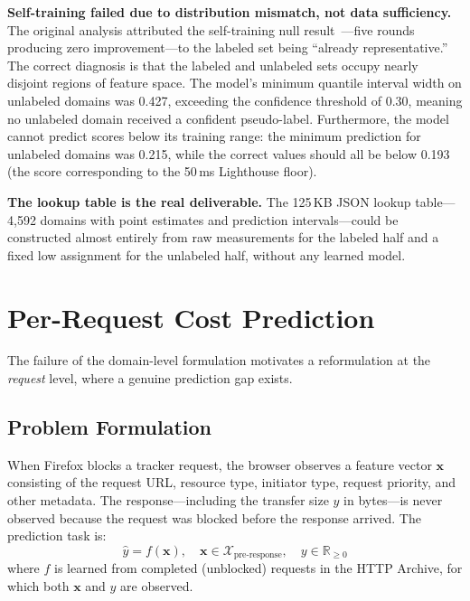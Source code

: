 \documentclass[11pt]{article}
\begin{document}
\textbf{Self-training failed due to distribution mismatch, not data sufficiency.} The original analysis attributed the self-training null result~\citep{yarowsky1995unsupervised}---five rounds producing zero improvement---to the labeled set being ``already representative.'' The correct diagnosis is that the labeled and unlabeled sets occupy nearly disjoint regions of feature space. The model's minimum quantile interval width on unlabeled domains was 0.427, exceeding the confidence threshold of 0.30, meaning no unlabeled domain received a confident pseudo-label. Furthermore, the model cannot predict scores below its training range: the minimum prediction for unlabeled domains was 0.215, while the correct values should all be below 0.193 (the score corresponding to the 50\,ms Lighthouse floor).

\textbf{The lookup table is the real deliverable.} The 125\,KB JSON lookup table---4,592 domains with point estimates and prediction intervals---could be constructed almost entirely from raw measurements for the labeled half and a fixed low assignment for the unlabeled half, without any learned model.


\section{Per-Request Cost Prediction}
\label{sec:per-request}

The failure of the domain-level formulation motivates a reformulation at the \emph{request} level, where a genuine prediction gap exists.

\subsection{Problem Formulation}

When Firefox blocks a tracker request, the browser observes a feature vector $\mathbf{x}$ consisting of the request URL, resource type, initiator type, request priority, and other metadata. The response---including the transfer size $y$ in bytes---is never observed because the request was blocked before the response arrived. The prediction task is:
\[
    \hat{y} = f(\mathbf{x}), \quad \mathbf{x} \in \mathcal{X}_{\text{pre-response}}, \quad y \in \mathbb{R}_{\geq 0}
\]
where $f$ is learned from completed (unblocked) requests in the HTTP Archive, for which both $\mathbf{x}$ and $y$ are observed.
\end{document}
